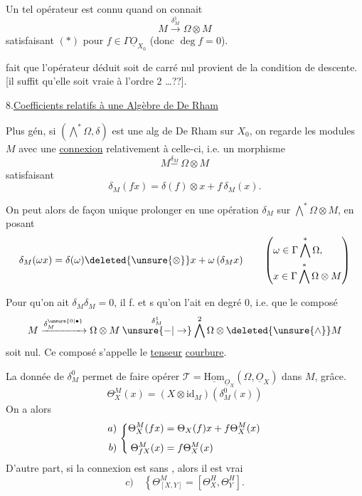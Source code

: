 Un tel opérateur est connu quand on connait
\[
M\xrightarrow{\delta_M^1}\Omega\otimes M
\]
satisfaisant $(*)$  pour $f\in\Gamma\underline O_{X_0}$ (donc $\deg f=0$).

 fait que l'opérateur déduit  soit de carré nul provient de la condition de descente. [il suffit qu'elle soit vraie à l'ordre 2 \ldots??].

8.\quad \uline{Coefficients relatifs à une Algèbre de De Rham}

Plus gén, si $(\bigwedge^*\Omega,\delta)$ est une alg de De Rham sur $X_0$, on  regarde les modules $M$ avec une \uline{connexion} relativement à celle-ci, i.e. un morphisme
\[
M\overset{\delta_M}{\mathbin{-}}\ \Omega\otimes M
\]
satisfaisant
\[
\delta_M(fx)=\delta(f)\otimes x+f\,\delta_M(x).
\]


On peut alors de façon unique prolonger en une  opération $\delta_M$ sur $\bigwedge^*\Omega\otimes M$, en posant
\[
\delta_M(\omega x)=\delta(\omega)\deleted{\unsure{\otimes}}x+\omega\,(\delta_M x)
\qquad\left(\begin{aligned}
&\omega\in\Gamma\bigwedge^*\Omega,\\
&x\in\Gamma\bigwedge^*\Omega\otimes M
\end{aligned}\right)
\]

Pour qu'on ait $\delta_M\delta_M=0$, il f. et s qu'on l'ait  en degré 0, i.e. que le composé
\[
M\xrightarrow{\delta_M^{\unsure{0|\bullet}}}\Omega\otimes M
\overset{\delta_M^1}{\mathbin{\unsure{-|\to}}}\bigwedge^2\Omega\otimes\deleted{\unsure{\wedge}} M
\]
soit nul. Ce composé s'appelle le \uline{tenseur} \uline{courbure}.

La donnée de  $\delta_M^0$ permet de faire opérer $\mathscr T=\underline{\mathrm{Hom}}_{\underline O_X}(\Omega,\underline O_X)$ dans $M$, grâce.
\[
\Theta_X^M(x)=(X\otimes\mathrm{id}_M)(\delta_M^0(x))
\]
On a alors
\[
\begin{array}{r@{\ }l}
\begin{aligned}a)\\[1ex] b)\end{aligned}&
\left\{\begin{aligned}
\Theta_X^M(fx)&=\Theta_X(f)x+f\Theta_X^M(x)\\[1ex]
\Theta_{fX}^M(x)&=f\Theta_X^M(x)
\end{aligned}\right.
\end{array}
\]
D'autre part, si la connexion est sans , alors il est vrai 
\[
c)\quad\left\{\Theta^M_{[X,Y]}=[\Theta_X^{H},\Theta_Y^{H}].\right.
\]

